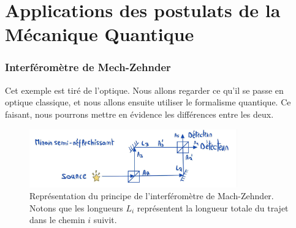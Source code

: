 \documentclass[../notesdecours.tex]{subfiles}
\begin{document}
\part{Applications des postulats de la Mécanique Quantique}
\section{Interféromètre de Mech-Zehnder}
Cet exemple est tiré de l'optique. Nous allons regarder ce qu'il se passe en optique classique, et nous allons ensuite utiliser le formalisme quantique. Ce faisant, nous pourrons mettre en évidence les différences entre les deux. \\

\begin{center}
\begin{figure}[h]
\centering
\includegraphics[width=0.80\textwidth]{Mach-Zehnder.png}
\caption{Représentation du principe de l'interféromètre de Mach-Zehnder. Notons que les longueurs $L_i$ représentent la longueur totale du trajet dans le chemin $i$ suivit.}
\label{Mach-Zehnder}
\end{figure}
\end{center}
\end{document}
